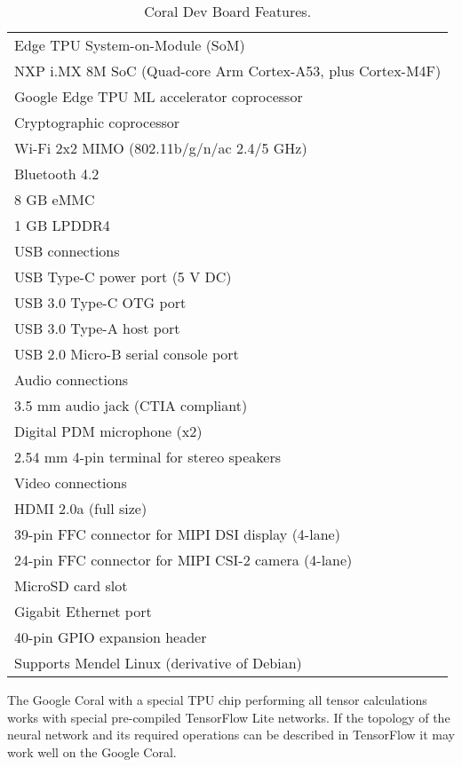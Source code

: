 \begin{table}[htb]
	\centering
	\begin{tabular}{l}
		\hline
		\rowcolor{aliceblue!85}Edge TPU System-on-Module (SoM)\\
		NXP i.MX 8M SoC (Quad-core Arm Cortex-A53, plus Cortex-M4F)\\
		\rowcolor{aliceblue!85}Google Edge TPU ML accelerator coprocessor\\
		Cryptographic coprocessor\\
		\rowcolor{aliceblue!85}Wi-Fi 2x2 MIMO (802.11b/g/n/ac 2.4/5 GHz)\\
		Bluetooth 4.2\\
		\rowcolor{aliceblue!85}8 GB eMMC\\
		1 GB LPDDR4\\
		\rowcolor{aliceblue!85}USB connections\\
		USB Type-C power port (5 V DC)\\
		\rowcolor{aliceblue!85}USB 3.0 Type-C OTG port\\
		USB 3.0 Type-A host port\\
		\rowcolor{aliceblue!85}USB 2.0 Micro-B serial console port\\
		Audio connections\\
		\rowcolor{aliceblue!85}3.5 mm audio jack (CTIA compliant)\\
		Digital PDM microphone (x2)\\
		\rowcolor{aliceblue!85}2.54 mm 4-pin terminal for stereo speakers\\
		Video connections\\
		\rowcolor{aliceblue!85}HDMI 2.0a (full size)\\
		39-pin FFC connector for MIPI DSI display (4-lane)\\
		\rowcolor{aliceblue!85}24-pin FFC connector for MIPI CSI-2 camera (4-lane)\\
		MicroSD card slot\\
		\rowcolor{aliceblue!85}Gigabit Ethernet port\\
		40-pin GPIO expansion header\\
		\rowcolor{aliceblue!85}Supports Mendel Linux (derivative of Debian)\\
		\hline
	\end{tabular}
	\caption{Coral Dev Board Features.}
	\label{tab:hard-devboard-spec}
\end{table}
%
\noindent The Google Coral with a special TPU chip performing all tensor
calculations works with special pre-compiled TensorFlow Lite networks. 
If the topology of the neural network and its required operations can be
described in TensorFlow it may work well on the Google Coral.

